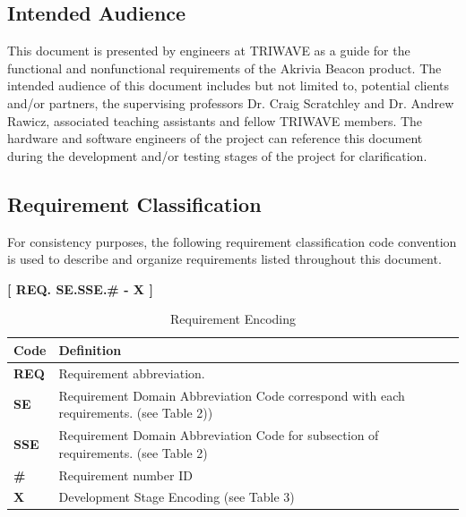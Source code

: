 \bigskip
\subsection{Intended Audience}
This document is presented by engineers at TRIWAVE as a guide for the functional and nonfunctional requirements of the Akrivia Beacon product. The intended audience of this document includes but not limited to, potential clients and/or partners, the supervising professors Dr. Craig Scratchley and Dr. Andrew Rawicz, associated teaching assistants and fellow TRIWAVE members. The hardware and software engineers of the project can reference this document during the development and/or testing stages of the project for clarification.

\break
\subsection{Requirement Classification}
\bigskip
For consistency purposes, the following requirement classification code convention is used to describe and organize requirements listed throughout this document. 
\begin{center}
\bigskip
	\textbf{[ REQ. SE.SSE.\# - X ]} 
\end{center}

\bgroup
\def\arraystretch{1.5}
\begin{table}[H]
\centering
\begin{tabular}{ | m{1cm} | m{13cm}| } 
\hline
\rowcolor{lightgray} \textbf{Code} & \textbf{Definition} \\ 
\hline
 \textbf{REQ} & Requirement abbreviation.  \\ 
\hline
 \textbf{SE} & Requirement Domain Abbreviation Code correspond with each requirements. (see Table 2))\\ 
\hline
 \textbf{SSE} & Requirement Domain Abbreviation Code for subsection of requirements. (see Table 2) \\  
\hline
 \textbf{\#} & Requirement number ID \\ 
\hline
 \textbf{X} & Development Stage Encoding (see Table 3)\\ 
\hline
\end{tabular}
\caption{Requirement Encoding}
\end{table}

